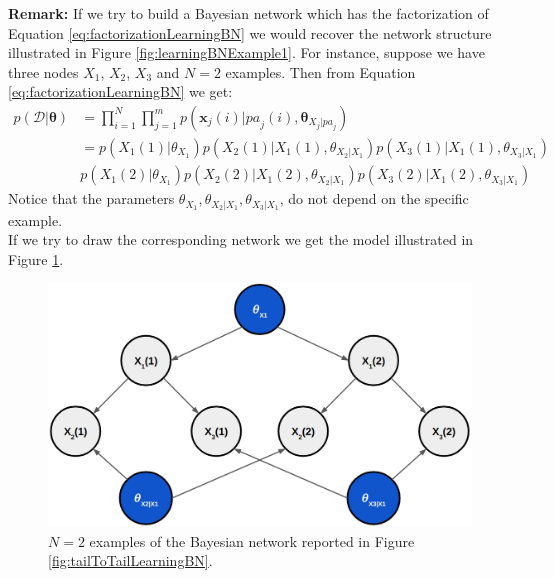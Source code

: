 \textbf{Remark:} If we try to build a Bayesian network which has the
factorization of Equation \ref{eq:factorizationLearningBN} we would recover the
network structure illustrated in Figure \ref{fig:learningBNExample1}. For instance,
suppose we have three nodes $X_{1}$, $X_{2}$, $X_{3}$ and $N=2$ examples. Then from
Equation \ref{eq:factorizationLearningBN} we get:
\begin{align*}
	p(\mathcal{D}|\pmb{\theta}) & = \prod_{i=1}^{N} \prod_{j=1}^{m} p(\pmb{x}_{j}(i) | \mathit{pa}_{j}(i), \pmb{\theta}_{X_j | \mathit{pa}_j}) \\
	                            & = p(X_{1}(1) | \theta_{X_1}) p(X_{2}(1)|X_{1}(1), \theta_{X_2|X_1}) p(X_{3}(1) | X_{1}(1), \theta_{X_3|X_1}) \\
	                            & p(X_{1}(2) | \theta_{X_1}) p(X_{2}(2)|X_{1}(2), \theta_{X_2|X_1}) p(X_{3}(2) | X_{1}(2), \theta_{X_3|X_1})
\end{align*}
Notice that the parameters $\theta_{X_1}, \theta_{X_2|X_1}, \theta_{X_3|X_1}$, do
not depend on the specific example.\\ If we try to draw the corresponding network
we get the model illustrated in Figure \ref{fig:learningBNSmallExample}.

\begin{figure}[H]
	\centering
	\includegraphics[width=\textwidth]{
		images/10_BayesianNetworksLearning_exampleLearning2.png
	}
	\caption{$N=2$ examples of the Bayesian network reported in Figure
	\ref{fig:tailToTailLearningBN}.}
	\label{fig:learningBNSmallExample}
\end{figure}

